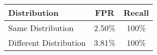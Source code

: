 \begin{table}[t]
    \centering
    \tiny
    \tabcolsep=30pt
    \caption{}
    \vspace{-1mm}
    \label{tab:rq3}
    \begin{tabular}{lcc}
        \toprule
        
        Distribution & FPR & Recall \\
        
        \midrule

        Same Distribution & 2.50\% & 100\% \\

        Different Distribution & 3.81\% & 100\% \\

        \bottomrule
        
    \end{tabular}
    \vspace{-2mm}
\end{table}